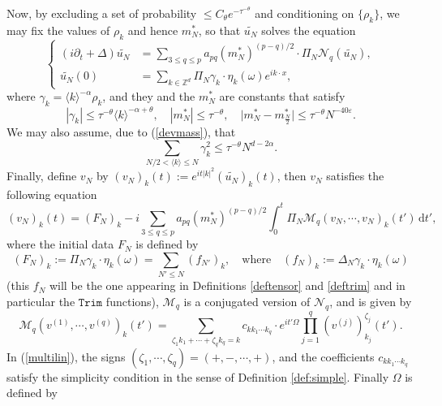 \documentclass[11 pt,reqno]{amsart}
\theoremstyle{definition}
\theoremstyle{remark}
\numberwithin{equation}{section}
\newcommand{\Nc}{\mathcal{N}}
\renewcommand{\Mc}{\mathcal{M}}
\newcommand{\Zb}{\mathbb{Z}}
\begin{document}
{Now, by excluding a set of probability $\leq C_\theta e^{-\tau^{-\theta}}$ and conditioning on $\{\rho_k\}$, we may fix the values of $\rho_k$ and hence $m_N^*$, so that $\widetilde{u_N}$ solves the equation
\begin{equation}\label{nlstruncgauged2}
\left\{
\begin{aligned}(i\partial_t+\Delta)\widetilde{u_N}&=\sum_{3\leq q\leq p}a_{pq}(m_N^*)^{(p-q)/2}\cdot\Pi_N\Nc_q(\widetilde{u_N}),\\
\widetilde{u_N}(0)&=\sum_{k\in\Zb^d}\Pi_N\gamma_k\cdot\eta_k(\omega)e^{ik\cdot x},
\end{aligned}
\right.
\end{equation} where $\gamma_k=\langle k\rangle^{-\alpha}\rho_k$, and they and the $m_N^*$ are constants that satisfy
\begin{equation}\label{constants}|\gamma_k|\leq \tau^{-\theta}\langle k\rangle^{-\alpha+\theta},\quad |m_N^*|\leq \tau^{-\theta},\quad \big|m_N^*-m_{\frac{N}{2}}^*\big|\leq \tau^{-\theta}N^{-40\varepsilon}.
\end{equation} We may also assume, due to (\ref{devmass}), that
\begin{equation}\label{constants2}\sum_{N/2<\langle k\rangle\leq N}\gamma_k^2\leq\tau^{-\theta}N^{d-2\alpha}.
\end{equation} Finally, define $v_N$ by $(v_N)_k(t):=e^{it|k|^2}(\widetilde{u_N})_k(t)$, then $v_N$ satisfies the following equation
\begin{equation}\label{reducedeqn}(v_N)_k(t)=(F_N)_k-i\sum_{3\leq q\leq p}a_{pq}(m_N^*)^{(p-q)/2}\int_0^t\Pi_N\Mc_q(v_N,\cdots,v_N)_k(t')\,\mathrm{d}t',
\end{equation} where the initial data $F_N$ is defined by 
\begin{equation}\label{deffnfn}(F_N)_k:=\Pi_N\gamma_k\cdot\eta_k(\omega)=\sum_{N'\leq N}(f_{N'})_k,\quad \mathrm{where}\quad(f_{N})_k:=\Delta_N\gamma_k\cdot\eta_k(\omega)
\end{equation} (this $f_N$ will be the one appearing in Definitions \ref{deftensor} and \ref{deftrim} and in particular the $\mathtt{Trim}$ functions), $\Mc_q$ is a conjugated version of $\Nc_q$, and is given by
\begin{equation}\label{multilin}\Mc_q(v^{(1)},\cdots, v^{(q)})_k(t')=\sum_{\zeta_1k_1+\cdots +\zeta_qk_q=k}c_{kk_1\cdots k_q}\cdot e^{it'\Omega}\prod_{j=1}^q(v^{(j)})_{k_j}^{\zeta_j}(t').
\end{equation} In (\ref{multilin}), the signs $(\zeta_1,\cdots,\zeta_q)=(+,-,\cdots,+)$, and the coefficients $c_{kk_1\cdots k_q}$ satisfy the simplicity condition in the sense of Definition \ref{def:simple}. Finally $\Omega$ is defined by
}
\end{document}
